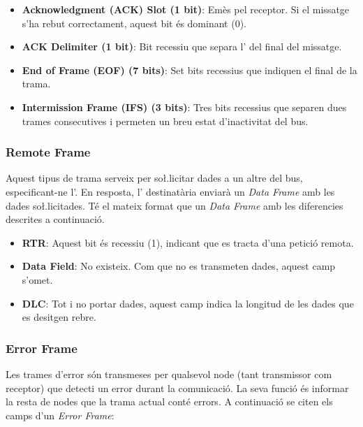 \documentclass{tfgitic}[2024/07/01]
\begin{document}
\begin{itemize}
  \item \textbf{Acknowledgment (ACK) Slot (1 bit)}: Emès pel receptor. Si el missatge s'ha rebut correctament, aquest bit és dominant (0).
  
  \item \textbf{ACK Delimiter (1 bit)}: Bit recessiu que separa l' del final del missatge.
    
  \item \textbf{End of Frame (EOF) (7 bits)}: Set bits recessius que indiquen el final de la trama.
  
  \item \textbf{Intermission Frame (IFS) (3 bits)}: Tres bits recessius que separen dues trames consecutives i permeten un breu estat d'inactivitat del bus.
\end{itemize} 

\subsubsection{Remote Frame}

Aquest tipus de trama serveix per so\l.licitar dades a un altre  del bus, especificant-ne l'. En resposta, l' destinatària enviarà un \textit{Data Frame} 
amb les dades so\l.licitades. Té el mateix format que un \textit{Data Frame} amb les diferencies descrites a continuació.

\begin{itemize}
  \item \textbf{RTR}: Aquest bit és recessiu (1), indicant que es tracta d'una petició remota.

  \item \textbf{Data Field}: No existeix. Com que no es transmeten dades, aquest camp s'omet.
  
  \item \textbf{DLC}: Tot i no portar dades, aquest camp indica la longitud de les dades que es desitgen rebre.
\end{itemize} 

\subsubsection{Error Frame}

Les trames d'error són transmeses per qualsevol node (tant transmissor com receptor) que detecti un error durant la comunicació. La seva funció és informar la 
resta de nodes que la trama actual conté errors. A continuació se citen els camps d'un \textit{Error Frame}:
\end{document}
